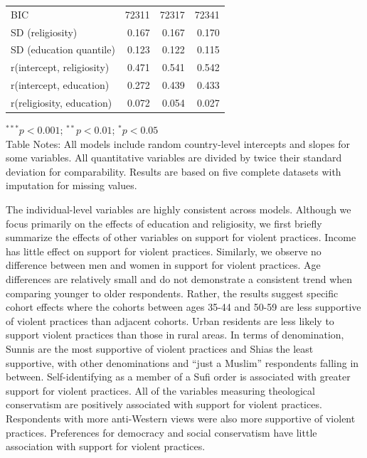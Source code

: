 \documentclass[10pt,letterpaper]{article}
\begin{document}
\begin{table}
\begin{adjustwidth}{-2.25in}{0in}
\begin{center}
\begin{tabular}{l D{)}{)}{13)3} D{)}{)}{13)3} D{)}{)}{13)3}}
BIC                                   & 72311                   & 72317                   & 72341                   \\
SD (religiosity)                      & 0.167                   & 0.167                   & 0.170                   \\
SD (education quantile)               & 0.123                   & 0.122                   & 0.115                   \\
r(intercept, religiosity)             & 0.471                   & 0.541                   & 0.542                   \\
r(intercept, education)               & 0.272                   & 0.439                   & 0.433                   \\
r(religiosity, education)             & 0.072                   & 0.054                   & 0.027                   \\
\hline
\end{tabular}
\begin{flushleft}
$^{***}p<0.001$; $^{**}p<0.01$; $^{*}p<0.05$ \\ Table Notes: All models include random country-level intercepts and slopes for some variables. All quantitative variables are divided by twice their standard deviation for comparability. Results are based on five complete datasets with imputation for missing values.
\end{flushleft}
\label{tab1}
\end{center}
\end{adjustwidth}
\end{table}

The individual-level variables are highly consistent across models.
Although we focus primarily on the effects of education and religiosity,
we first briefly summarize the effects of other variables on support for
violent practices. Income has little effect on support for violent
practices. Similarly, we observe no difference between men and women in
support for violent practices. Age differences are relatively small and
do not demonstrate a consistent trend when comparing younger to older
respondents. Rather, the results suggest specific cohort effects where
the cohorts between ages 35-44 and 50-59 are less supportive of violent
practices than adjacent cohorts. Urban residents are less likely to
support violent practices than those in rural areas. In terms of
denomination, Sunnis are the most supportive of violent practices and
Shias the least supportive, with other denominations and ``just a
Muslim'' respondents falling in between. Self-identifying as a member of
a Sufi order is associated with greater support for violent practices.
All of the variables measuring theological conservatism are positively
associated with support for violent practices. Respondents with more
anti-Western views were also more supportive of violent practices.
Preferences for democracy and social conservatism have little
association with support for violent practices.
\end{document}
